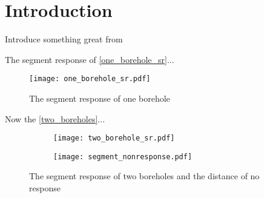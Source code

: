 \section{Introduction}

Introduce something great from \cite{Cook_Spitler_2021}

The segment response of \autoref{one_borehole_sr}...

\begin{figure}[hbt!]
  \centering
  \texttt{[image: one\_borehole\_sr.pdf]}
  \caption{The segment response of one borehole}
  \label{one_borehole_sr}
\end{figure} 

Now the \autoref{two_boreholes}...

\begin{figure}[hbt!]
     \centering
     \begin{subfigure}[b]{0.4\textwidth}
         \centering
         \texttt{[image: two\_borehole\_sr.pdf]}
         \caption*{}
     \end{subfigure}
     \begin{subfigure}[b]{0.4\textwidth}
         \centering
         \texttt{[image: segment\_nonresponse.pdf]}
         \caption*{}
     \end{subfigure}
     \caption{The segment response of two boreholes and the distance of no response}
     \label{two_boreholes}
\end{figure} 

